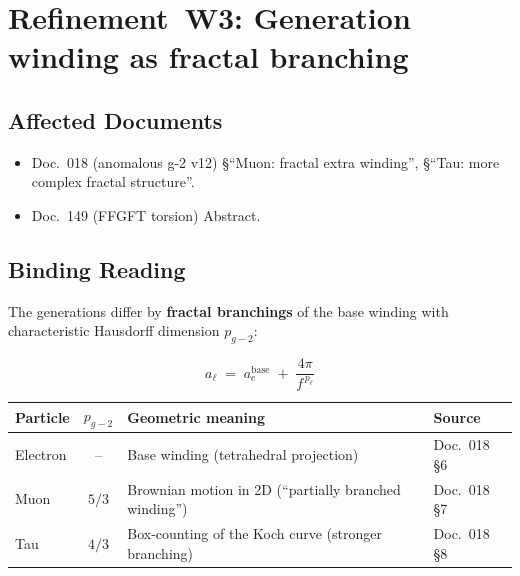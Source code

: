 \section{\texorpdfstring{Refinement~W3: Generation winding as fractal branching}{Refinement W3: Generation winding as fractal branching}}

\subsection*{Affected Documents}

\begin{itemize}
  \item Doc.~018 (anomalous g-2 v12) §\enquote{Muon: fractal extra
        winding}, §\enquote{Tau: more complex fractal structure}.
  \item Doc.~149 (FFGFT torsion) Abstract.
\end{itemize}

\subsection*{Binding Reading}

The generations differ by \textbf{fractal branchings} of the base
winding with characteristic Hausdorff dimension $p_{g\!-\!2}$:

\begin{equation}
  a_\ell \;=\; a_e^{\text{base}} \;+\; \frac{4\pi}{f^{\,p_{\ell}}}
  \tag{210.3}
\end{equation}

\begin{center}
\renewcommand{\arraystretch}{1.3}
{\footnotesize
\begin{tabular}{lc>{\raggedright\arraybackslash}p{6.5cm}l}
\toprule
\textbf{Particle} & \textbf{$p_{g\!-\!2}$} & \textbf{Geometric meaning} & \textbf{Source} \\
\midrule
Electron & --   & Base winding (tetrahedral projection) & Doc.~018 §6 \\
Muon     & $5/3$ & Brownian motion in 2D (\enquote{partially branched winding}) & Doc.~018 §7 \\
Tau      & $4/3$ & Box-counting of the Koch curve (stronger branching) & Doc.~018 §8 \\
\bottomrule
\end{tabular}
}
\renewcommand{\arraystretch}{1.0}
\end{center}


